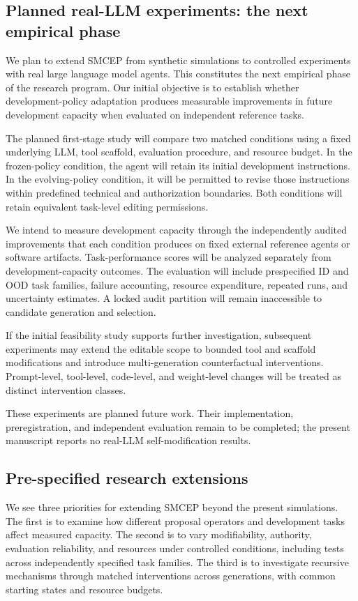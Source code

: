 \documentclass[11pt,a4paper]{article}
\begin{document}
\subsection{Planned real-LLM experiments: the next empirical phase}
We plan to extend SMCEP from synthetic simulations to controlled experiments with real large language
model agents. This constitutes the next empirical phase of the research program. Our initial objective
is to establish whether development-policy adaptation produces measurable improvements in future development capacity when evaluated on independent reference tasks.

The planned first-stage study will compare two matched conditions using a fixed underlying LLM,
tool scaffold, evaluation procedure, and resource budget. In the frozen-policy condition, the agent
will retain its initial development instructions. In the evolving-policy condition, it will be
permitted to revise those instructions within predefined technical and authorization boundaries.
Both conditions will retain equivalent task-level editing permissions.

We intend to measure development capacity through the independently audited improvements that each
condition produces on fixed external reference agents or software artifacts. Task-performance
scores will be analyzed separately from development-capacity outcomes. The evaluation
will include prespecified ID and OOD task families, failure accounting, resource expenditure,
repeated runs, and uncertainty estimates. A locked audit partition will remain inaccessible
to candidate generation and selection.

If the initial feasibility study supports further investigation, subsequent experiments may extend
the editable scope to bounded tool and scaffold modifications and introduce multi-generation counterfactual interventions. Prompt-level, tool-level, code-level, and weight-level changes
will be treated as distinct intervention classes.

These experiments are planned future work. Their implementation, preregistration, and independent evaluation remain to be completed; the present manuscript reports no real-LLM self-modification results.

\subsection{Pre-specified research extensions}
We see three priorities for extending SMCEP beyond the present simulations. The first is to examine
how different proposal operators and development tasks affect measured capacity. The second is to
vary modifiability, authority, evaluation reliability, and resources under controlled conditions, including tests across independently specified task families. The third is to investigate recursive mechanisms through matched interventions across generations, with common starting states and resource budgets.
\end{document}
